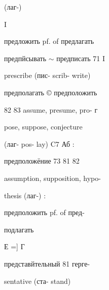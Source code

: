 \begin{minipage}[t]{0.475\textwidth}
\noindent (лаг-)\par
\noindent I\par
\noindent предложить pf. of предлагать\par
\noindent предпйсывать $\sim$ предписать 71 I\par
\noindent prescribe (пис- scrib- write)\par
\noindent предполагать © предположить\par
{} 82 83 assume, presume, pro- г\par
\noindent pose, suppose, conjecture\par
\noindent (лаг- pos- lay) C7 Аб :\par
\noindent предположёние 73 81 82\par
\noindent assumption, supposition, hypo-\par
\noindent thesis (лаг-) :\par
\noindent предположить pf. of пред-\par
\noindent подлагать\par
\noindent Е =] Г\par
\noindent представйтельный 81 герге-\par
\noindent sentative (ста- stand)\par
\end{minipage}\hfill
